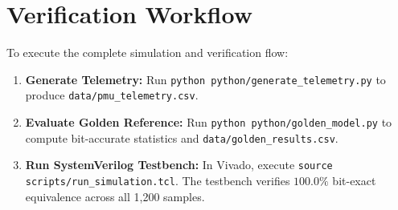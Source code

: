 \documentclass[11pt,a4paper]{report}
\begin{document}
\section{Verification Workflow}
To execute the complete simulation and verification flow:
\begin{enumerate}
    \item \textbf{Generate Telemetry:} Run \texttt{python python/generate\_telemetry.py} to produce \texttt{data/pmu\_telemetry.csv}.
    \item \textbf{Evaluate Golden Reference:} Run \texttt{python python/golden\_model.py} to compute bit-accurate statistics and \texttt{data/golden\_results.csv}.
    \item \textbf{Run SystemVerilog Testbench:} In Vivado, execute \texttt{source scripts/run\_simulation.tcl}. The testbench verifies $100.0\%$ bit-exact equivalence across all 1,200 samples.
\end{enumerate}
\end{document}
